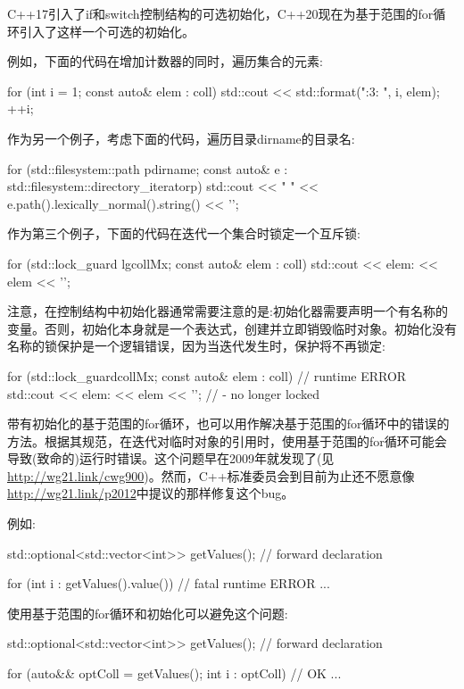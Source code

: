 
C++17引入了if和switch控制结构的可选初始化，C++20现在为基于范围的for循环引入了这样一个可选的初始化。

例如，下面的代码在增加计数器的同时，遍历集合的元素:

\begin{cpp}
for (int i = 1; const auto& elem : coll) {
	std::cout << std::format("{:3}: {}\n", i, elem);
	++i;
}
\end{cpp}

作为另一个例子，考虑下面的代码，遍历目录dirname的目录名:

\begin{cpp}
for (std::filesystem::path p{dirname};
const auto& e : std::filesystem::directory_iterator{p}) {
	std::cout << " " << e.path().lexically_normal().string() << '\n';
}
\end{cpp}

作为第三个例子，下面的代码在迭代一个集合时锁定一个互斥锁:

\begin{cpp}
for (std::lock_guard lg{collMx}; const auto& elem : coll) {
	std::cout << elem: << elem << '\n';
}
\end{cpp}

注意，在控制结构中初始化器通常需要注意的是:初始化器需要声明一个有名称的变量。否则，初始化本身就是一个表达式，创建并立即销毁临时对象。初始化没有名称的锁保护是一个逻辑错误，因为当迭代发生时，保护将不再锁定:

\begin{cpp}
for (std::lock_guard{collMx}; const auto& elem : coll) { // runtime ERROR
	std::cout << elem: << elem << '\n'; // - no longer locked
}
\end{cpp}

带有初始化的基于范围的for循环，也可以用作解决基于范围的for循环中的错误的方法。根据其规范，在迭代对临时对象的引用时，使用基于范围的for循环可能会导致(致命的)运行时错误。这个问题早在2009年就发现了(见\url{http://wg21.link/cwg900})。然而，C++标准委员会到目前为止还不愿意像\url{http://wg21.link/p2012}中提议的那样修复这个bug。

例如:

\begin{cpp}
std::optional<std::vector<int>> getValues(); // forward declaration

for (int i : getValues().value()) { // fatal runtime ERROR
	...
}
\end{cpp}

使用基于范围的for循环和初始化可以避免这个问题:

\begin{cpp}
std::optional<std::vector<int>> getValues(); // forward declaration

for (auto&& optColl = getValues(); int i : optColl) { // OK
	...
}
\end{cpp}

